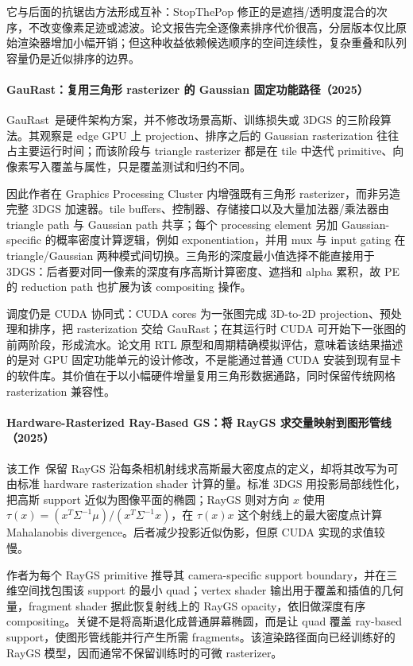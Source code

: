它与后面的抗锯齿方法形成互补：StopThePop 修正的是遮挡/透明度混合的次序，不改变像素足迹或滤波。论文报告完全逐像素排序代价很高，分层版本仅比原始渲染器增加小幅开销；但这种收益依赖候选顺序的空间连续性，复杂重叠和队列容量仍是近似排序的边界。

\paragraph{GauRast：复用三角形 rasterizer 的 Gaussian 固定功能路径（2025）\cite{2503_16681}}
GauRast~\cite{2503_16681}是硬件架构方案，并不修改场景高斯、训练损失或 3DGS 的三阶段算法。其观察是 edge GPU 上 projection、排序之后的 Gaussian rasterization 往往占主要运行时间；而该阶段与 triangle rasterizer 都是在 tile 中迭代 primitive、向像素写入覆盖与属性，只是覆盖测试和归约不同。

因此作者在 Graphics Processing Cluster 内增强既有三角形 rasterizer，而非另造完整 3DGS 加速器。tile buffers、控制器、存储接口以及大量加法器/乘法器由 triangle path 与 Gaussian path 共享；每个 processing element 另加 Gaussian-specific 的概率密度计算逻辑，例如 exponentiation，并用 mux 与 input gating 在 triangle/Gaussian 两种模式间切换。三角形的深度最小值选择不能直接用于 3DGS：后者要对同一像素的深度有序高斯计算密度、遮挡和 alpha 累积，故 PE 的 reduction path 也扩展为该 compositing 操作。

调度仍是 CUDA 协同式：CUDA cores 为一张图完成 3D-to-2D projection、预处理和排序，把 rasterization 交给 GauRast；在其运行时 CUDA 可开始下一张图的前两阶段，形成流水。论文用 RTL 原型和周期精确模拟评估，意味着该结果描述的是对 GPU 固定功能单元的设计修改，不是能通过普通 CUDA 安装到现有显卡的软件库。其价值在于以小幅硬件增量复用三角形数据通路，同时保留传统网格 rasterization 兼容性。

\paragraph{Hardware-Rasterized Ray-Based GS：将 RayGS 求交量映射到图形管线（2025）\cite{2503_18682}}
该工作~\cite{2503_18682}保留 RayGS 沿每条相机射线求高斯最大密度点的定义，却将其改写为可由标准 hardware rasterization shader 计算的量。标准 3DGS 用投影局部线性化，把高斯 support 近似为图像平面的椭圆；RayGS 则对方向 $x$ 使用 $\tau(x)=(x^T\Sigma^{-1}\mu)/(x^T\Sigma^{-1}x)$，在 $\tau(x)x$ 这个射线上的最大密度点计算 Mahalanobis divergence。后者减少投影近似伪影，但原 CUDA 实现的求值较慢。

作者为每个 RayGS primitive 推导其 camera-specific support boundary，并在三维空间找包围该 support 的最小 quad；vertex shader 输出用于覆盖和插值的几何量，fragment shader 据此恢复射线上的 RayGS opacity，依旧做深度有序 compositing。关键不是将高斯退化成普通屏幕椭圆，而是让 quad 覆盖 ray-based support，使图形管线能并行产生所需 fragments。该渲染路径面向已经训练好的 RayGS 模型，因而通常不保留训练时的可微 rasterizer。

